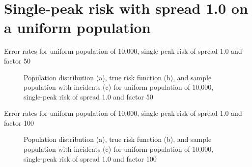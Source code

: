 \section{Single-peak risk with spread 1.0 on a uniform population}
\label{sec:app:results_unif_1.0_1h}

\graphicspath{{./results/unif_50_1.0_1h/}}
\makeatletter
{}
\makeatother

\begin{table}[H]
    
    \caption[]{Error rates for uniform population of 10,000, single-peak risk of \gls{spread} 1.0 and \gls{factor} 50}
    \label{tab:mean_error_rates:unif_50_1.0_1h}
\end{table}

\begin{figure}[H]
    
    \caption[]{Population distribution (a), true risk function (b), and sample population with incidents (c) for uniform population of 10,000, single-peak risk of \gls{spread} 1.0 and \gls{factor} 50}
    \label{fig:distributions:unif_50_1.0_1h}    
\end{figure}


\graphicspath{{./results/unif_100_1.0_1h/}}
\makeatletter
{}
\makeatother

\begin{table}[H]

\caption[]{Error rates for uniform population of 10,000, single-peak risk of \gls{spread} 1.0 and \gls{factor} 100}
\label{tab:mean_error_rates:unif_100_1.0_1h}
\end{table}

\begin{figure}[H]
    
    \caption[]{Population distribution (a), true risk function (b), and sample population with incidents (c) for uniform population of 10,000, single-peak risk of \gls{spread} 1.0 and \gls{factor} 100}
    \label{fig:distributions:unif_100_1.0_1h}    
\end{figure}


\graphicspath{{./results/unif_200_1.0_1h/}}
\makeatletter
{}
\makeatother

